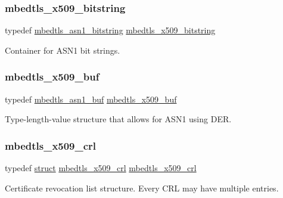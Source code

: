\subsubsection{\texorpdfstring{mbedtls\+\_\+x509\+\_\+bitstring}{mbedtls\_x509\_bitstring}}
{\footnotesize\ttfamily typedef \hyperlink{structmbedtls__asn1__bitstring}{mbedtls\+\_\+asn1\+\_\+bitstring} \hyperlink{group__x509__module_gaf25a97602f25027e160f22f6d5590636}{mbedtls\+\_\+x509\+\_\+bitstring}}

Container for A\+S\+N1 bit strings. \mbox{\label{group__x509__module_ga4d02c9e8e4e2934555e0d132cd2976dc}} 
\subsubsection{\texorpdfstring{mbedtls\+\_\+x509\+\_\+buf}{mbedtls\_x509\_buf}}
{\footnotesize\ttfamily typedef \hyperlink{structmbedtls__asn1__buf}{mbedtls\+\_\+asn1\+\_\+buf} \hyperlink{group__x509__module_ga4d02c9e8e4e2934555e0d132cd2976dc}{mbedtls\+\_\+x509\+\_\+buf}}

Type-\/length-\/value structure that allows for A\+S\+N1 using D\+ER. \mbox{\label{group__x509__module_ga7957605a0ced963e12880ec9e19874fc}} 
\subsubsection{\texorpdfstring{mbedtls\+\_\+x509\+\_\+crl}{mbedtls\_x509\_crl}}
{\footnotesize\ttfamily typedef \hyperlink{interfacestruct}{struct} \hyperlink{structmbedtls__x509__crl}{mbedtls\+\_\+x509\+\_\+crl}
 \hyperlink{structmbedtls__x509__crl}{mbedtls\+\_\+x509\+\_\+crl}}

Certificate revocation list structure. Every C\+RL may have multiple entries. \mbox{\label{group__x509__module_ga1e0c6230061fd501f9d00bd1b09ade33}} 

